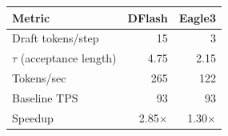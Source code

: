 \centering
\begin{tabular}{lrr}
\toprule
Metric & \multicolumn{1}{c}{DFlash} & \multicolumn{1}{c}{Eagle3} \\
\midrule
Draft tokens/step & 15 & 3 \\
$\tau$ (acceptance length) & 4.75 & 2.15 \\
Tokens/sec & 265 & 122 \\
Baseline TPS & 93 & 93 \\
Speedup & 2.85$\times$ & 1.30$\times$ \\
\bottomrule
\end{tabular}